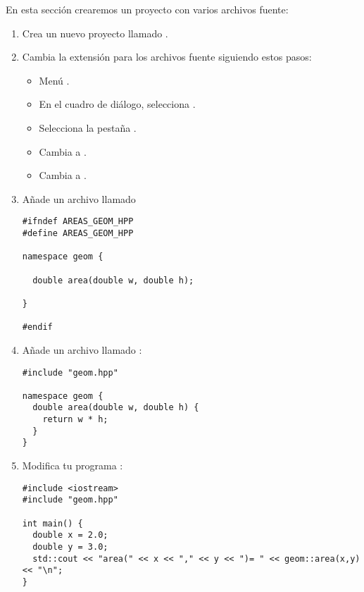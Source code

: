 En esta sección crearemos un proyecto con varios archivos fuente:

\begin{enumerate}

\item
Crea un nuevo proyecto llamado .

\item
Cambia la extensión para los archivos fuente siguiendo estos pasos:
\begin{itemize}
  \item Menú .
  \item En el cuadro de diálogo, selecciona .
  \item Selecciona la pestaña .
  \item Cambia  a .
  \item Cambia  a .
\end{itemize}

\item
Añade un archivo llamado 

\begin{lstlisting}
#ifndef AREAS_GEOM_HPP
#define AREAS_GEOM_HPP

namespace geom {

  double area(double w, double h);

}

#endif
\end{lstlisting}

\item 
Añade un archivo llamado :

\begin{lstlisting}
#include "geom.hpp"

namespace geom {
  double area(double w, double h) {
    return w * h;
  }
}
\end{lstlisting}

\item
Modifica tu programa :

\begin{lstlisting}
#include <iostream>
#include "geom.hpp"

int main() {
  double x = 2.0;
  double y = 3.0;
  std::cout << "area(" << x << "," << y << ")= " << geom::area(x,y) << "\n";
}
\end{lstlisting}


\end{enumerate}
